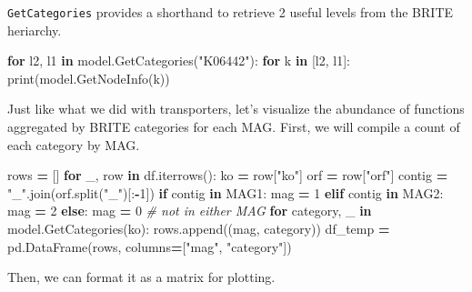\documentclass[
]{book}
\newenvironment{Shaded}{\begin{snugshade}}{\end{snugshade}}
\newcommand{\BuiltInTok}[1]{#1}
\newcommand{\CommentTok}[1]{\textcolor[rgb]{0.56,0.35,0.01}{\textit{#1}}}
\newcommand{\ControlFlowTok}[1]{\textcolor[rgb]{0.13,0.29,0.53}{\textbf{#1}}}
\newcommand{\DecValTok}[1]{\textcolor[rgb]{0.00,0.00,0.81}{#1}}
\newcommand{\KeywordTok}[1]{\textcolor[rgb]{0.13,0.29,0.53}{\textbf{#1}}}
\newcommand{\NormalTok}[1]{#1}
\newcommand{\OperatorTok}[1]{\textcolor[rgb]{0.81,0.36,0.00}{\textbf{#1}}}
\newcommand{\StringTok}[1]{\textcolor[rgb]{0.31,0.60,0.02}{#1}}
\begin{document}
\texttt{GetCategories} provides a shorthand to retrieve 2 useful levels from the BRITE heriarchy.

\begin{Shaded}
\begin{Highlighting}[numbers=left,,]
\ControlFlowTok{for}\NormalTok{ l2, l1 }\KeywordTok{in}\NormalTok{ model.GetCategories(}\StringTok{"K06442"}\NormalTok{):}
    \ControlFlowTok{for}\NormalTok{ k }\KeywordTok{in}\NormalTok{ [l2, l1]:}
        \BuiltInTok{print}\NormalTok{(model.GetNodeInfo(k))}
\end{Highlighting}
\end{Shaded}

Just like what we did with transporters, let's visualize the abundance of functions aggregated by BRITE
categories for each MAG. First, we will compile a count of each category by MAG.

\begin{Shaded}
\begin{Highlighting}[numbers=left,,]
\NormalTok{rows }\OperatorTok{=}\NormalTok{ []}
\ControlFlowTok{for}\NormalTok{ \_, row }\KeywordTok{in}\NormalTok{ df.iterrows():}
\NormalTok{    ko }\OperatorTok{=}\NormalTok{ row[}\StringTok{"ko"}\NormalTok{]}
\NormalTok{    orf }\OperatorTok{=}\NormalTok{ row[}\StringTok{"orf"}\NormalTok{]}
\NormalTok{    contig }\OperatorTok{=} \StringTok{"\_"}\NormalTok{.join(orf.split(}\StringTok{"\_"}\NormalTok{)[:}\OperatorTok{{-}}\DecValTok{1}\NormalTok{])}
    \ControlFlowTok{if}\NormalTok{ contig }\KeywordTok{in}\NormalTok{ MAG1:}
\NormalTok{        mag }\OperatorTok{=} \DecValTok{1}
    \ControlFlowTok{elif}\NormalTok{ contig }\KeywordTok{in}\NormalTok{ MAG2:}
\NormalTok{        mag }\OperatorTok{=} \DecValTok{2}
    \ControlFlowTok{else}\NormalTok{:}
\NormalTok{        mag }\OperatorTok{=} \DecValTok{0} \CommentTok{\# not in either MAG}
    \ControlFlowTok{for}\NormalTok{ category, \_ }\KeywordTok{in}\NormalTok{ model.GetCategories(ko):}
\NormalTok{        rows.append((mag, category))}
\NormalTok{df\_temp }\OperatorTok{=}\NormalTok{ pd.DataFrame(rows, columns}\OperatorTok{=}\NormalTok{[}\StringTok{"mag"}\NormalTok{, }\StringTok{"category"}\NormalTok{])}
\end{Highlighting}
\end{Shaded}

Then, we can format it as a matrix for plotting.
\end{document}
